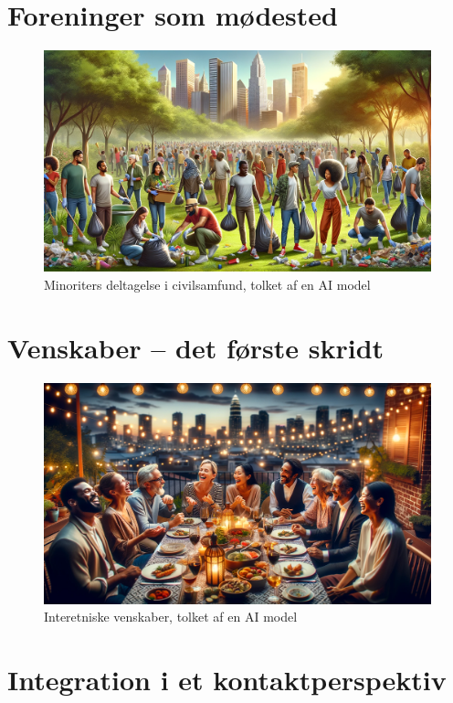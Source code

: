 \documentclass[
]{book}
\begin{document}
\chapter{Foreninger som mødested}\label{kap5}

\begin{figure}
\includegraphics[width=1\linewidth]{images/dalle-civil} \caption{Minoriters deltagelse i civilsamfund, tolket af en AI model}\label{fig:fig-civil}
\end{figure}

\chapter{Venskaber -- det første skridt}\label{kap6}

\begin{figure}
\includegraphics[width=1\linewidth]{images/dalle-friendships} \caption{Interetniske venskaber, tolket af en AI model}\label{fig:fig-friendships}
\end{figure}

\chapter{Integration i et kontaktperspektiv}\label{kap7}
\end{document}
